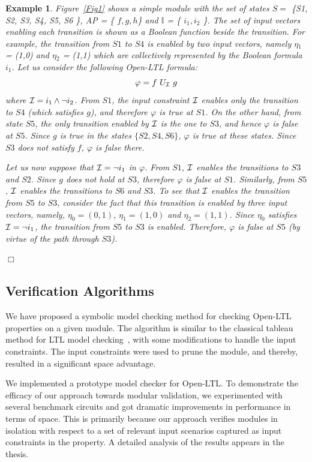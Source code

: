 \documentclass[a4paper, 11pt]{article}
\newtheorem{example}{Example} %
\begin{document}
\begin{example}
{\em
Figure~\ref{Fig1} shows a simple module with the set of states 
$S =$  \{S1, S2, S3, S4, S5, S6 \},
{\cal AP} = \{ $f, g, h$\} and $\mathbb{I}$ = \{ $i_1, i_2$ \}.
The set of input vectors enabling each transition is shown as a Boolean
function beside the transition. For example, the transition from
$S1$  to  $S4$ is
enabled by two input vectors, namely $\eta{_1}$ = (1,0) and $\eta{_2}$ = (1,1)
which are collectively represented by the Boolean formula $i_1$.
Let us consider the following Open-LTL formula:
\[ \varphi  =  f\  U_{\cal I}\  g \]
where ${\cal I} = i_1 \land \neg i_2$. From $S1$, the input
constraint ${\cal I}$
enables only the transition to $S4$ (which satisfies $g$), and therefore
$\varphi$ is true at $S1$. On the other hand, from state $S5$, the only
transition enabled by ${\cal I}$ is the one to $S3$, and hence $\varphi$ is
false at $S5$. Since $g$ is true in the states
$\{S2, S4, S6\}$, $\varphi$ is true at these states. Since $S3$
does not satisfy $f$, $\varphi$ is false there.

Let us now suppose that ${\cal I} = \neg i_1$ in $\varphi$. From $S1$,
${\cal I}$ enables the transitions to $S3$ and $S2$. Since $g$ does not
hold at $S3$, therefore $\varphi$ is false at $S1$.
Similarly, from $S5$, ${\cal I}$ enables the transitions to $S6$ and $S3$.
To see
that ${\cal I}$ enables the transition from $S5$ to $S3$, consider the
fact that this transition is enabled by three input vectors, namely,
$\eta_0 = (0,1)$, $\eta_1 = (1,0)$ and $\eta_2 = (1,1)$.
Since $\eta_0$ satisfies ${\cal I} = \neg i_1$, the transition from
$S5$ to $S3$ is enabled. Therefore, $\varphi$ is false at $S5$ (by
virtue of the path through $S3$).
} $\Box$
\end{example}

\subsection{Verification Algorithms} \label{sec6.4}
\noindent
We have proposed a symbolic model checking method for checking
Open-LTL properties on a given module. The algorithm is similar to the
classical tableau method for LTL model checking~\cite{clarke:00}, with 
some modifications to handle the input constraints. The input constraints 
were used to prune the module, and thereby, resulted in a
significant space advantage.

We implemented a prototype model checker for Open-LTL. To demonstrate 
the efficacy of our approach towards modular validation, we 
experimented with several benchmark circuits and got dramatic 
improvements in performance in terms of space. This is primarily 
because our approach 
verifies modules in isolation with respect to a set of relevant input 
scenarios captured as input constraints in the property. A detailed 
analysis of the results appears in the thesis.
\end{document}
